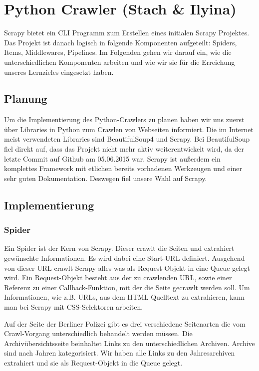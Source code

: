 

\chapter{Python Crawler \small(Stach \& Ilyina)}

Scrapy bietet ein CLI Programm zum Erstellen eines initialen Scrapy Projektes.
Das Projekt ist danach logisch in folgende Komponenten aufgeteilt: Spiders, Items, Middlewares, Pipelines.
Im Folgenden gehen wir darauf ein, wie die unterschiedlichen Komponenten arbeiten und wie wir sie für die
Erreichung unseres Lernzieles eingesetzt haben.

\section{Planung}

Um die Implementierung des Python-Crawlers zu planen haben wir uns zuerst
über Libraries in Python zum Crawlen von Webseiten informiert. Die im
Internet meist verwendeten Libraries sind BeautifulSoup4\cite{beausoup}
und Scrapy\cite{scrapy}. Bei BeautifulSoup fiel direkt auf, dass das Projekt
nicht mehr aktiv weiterentwickelt wird, da der letzte Commit auf Github am
05.06.2015 war. Scrapy ist außerdem ein komplettes Framework mit etlichen
bereits vorhadenen Werkzeugen und einer sehr guten Dokumentation. Deswegen
fiel unsere Wahl auf Scrapy.

\section{Implementierung}

\subsection{Spider}

Ein Spider ist der Kern von Scrapy. Dieser crawlt die Seiten und extrahiert gewünschte Informationen.
Es wird dabei eine Start-URL definiert. Ausgehend von dieser URL crawlt Scrapy alles was als Request-Objekt in
eine Queue gelegt wird. Ein Request-Objekt besteht aus der zu crawlenden URL, sowie einer Referenz zu einer Callback-Funktion,
mit der die Seite gecrawlt werden soll. Um Informationen, wie z.B. URLs, aus dem HTML Quelltext zu extrahieren, kann man bei Scrapy
mit CSS-Selektoren arbeiten.

Auf der Seite der Berliner Polizei gibt es drei verschiedene Seitenarten die vom Crawl-Vorgang
unterschiedlich behandelt werden müssen. Die Archivübersichtsseite beinhaltet Links zu den unterschiedlichen Archiven.
Archive sind nach Jahren kategorisiert. Wir haben alle Links zu den Jahresarchiven extrahiert und sie als Request-Objekt in die Queue gelegt.

